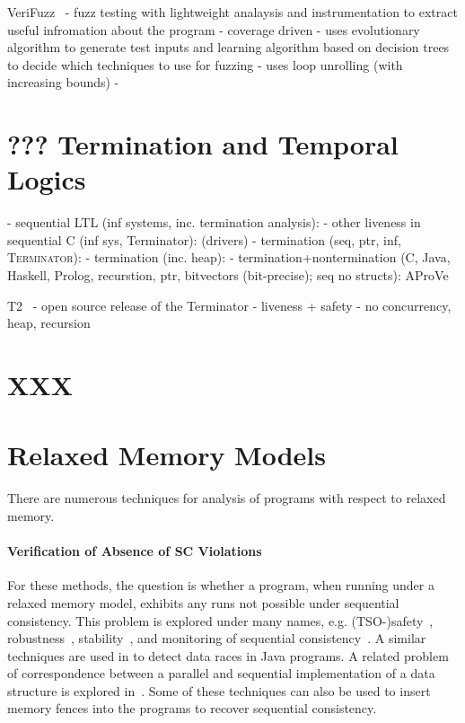 VeriFuzz~
- fuzz testing with lightweight analaysis and instrumentation to extract useful infromation about the program
- coverage driven
- uses evolutionary algorithm to generate test inputs and learning algorithm based on decision trees to decide which techniques to use for fuzzing
- uses loop unrolling (with increasing bounds)
- 


\section{??? Termination and Temporal Logics}

- sequential LTL (inf systems, inc. termination analysis): \cite{Dietsch2015}
- other liveness in sequential C (inf sys, Terminator): \cite{Cook2007} (drivers)
- termination (seq, ptr, inf, \textsc{Terminator}): \cite{Cook2006}
- termination (inc. heap): \cite{Berdine2006}
- termination+nontermination (C, Java, Haskell, Prolog, recurstion, ptr, bitvectors (bit-precise); seq no structs): AProVe \cite{Hensel2017, Giesl2017}

T2~\cite{Brockschmidt2016}
- open source release of the Terminator
- liveness + safety
- no concurrency, heap, recursion

\section{XXX}


\section{Relaxed Memory Models}

There are numerous techniques for analysis of programs with respect to relaxed memory.

\paragraph{Verification of Absence of SC Violations}

For these methods, the question is whether a program, when running under a relaxed memory model, exhibits any runs not possible under sequential consistency.
This problem is explored under many names, e.g. (TSO-)safety~\cite{Burckhardt2008}, robustness~\cite{Bouajjani2013,Derevenetc2014}, stability~\cite{Alglave2011}, and monitoring of sequential consistency~\cite{Burnim2011}.
A similar techniques are used in \cite{Yang2004} to detect data races in Java programs.
A related problem of correspondence between a parallel and sequential implementation of a data structure is explored in~\cite{Ou2017}.
Some of these techniques can also be used to insert memory fences into the programs to recover sequential consistency.

